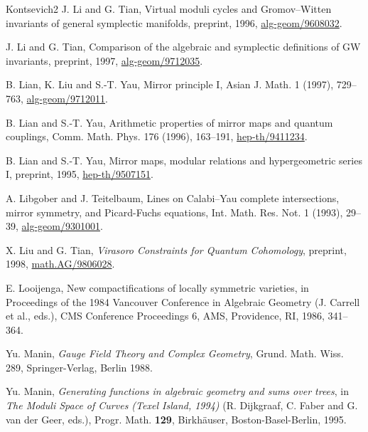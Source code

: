 \begin{thebibliography}{Kontsevich2}
\hypertarget{bib:LTi3}{}
J. Li and G. Tian, Virtual moduli cycles and Gromov--Witten invariants of general symplectic manifolds, preprint, 1996, \href{https://arxiv.org/abs/alg-geom/9608032}{alg-geom/9608032}.

\hypertarget{bib:LTi4}{}
J. Li and G. Tian, Comparison of the algebraic and symplectic definitions of GW invariants, preprint, 1997, \href{https://arxiv.org/abs/alg-geom/9712035}{alg-geom/9712035}.

\hypertarget{bib:LLY}{}
B. Lian, K. Liu and S.-T. Yau, Mirror principle I,
Asian J. Math. 1 (1997), 729--763, \href{https://arxiv.org/abs/alg-geom/9712011}{alg-geom/9712011}.

\hypertarget{bib:LY1}{}
B. Lian and S.-T. Yau,
Arithmetic properties of mirror maps and quantum couplings,
Comm. Math. Phys. 176 (1996), 163--191, \href{https://arxiv.org/abs/hep-th/9411234}{hep-th/9411234}.

\hypertarget{bib:LY2}{}
B. Lian and S.-T. Yau, Mirror maps, modular relations and
hypergeometric series I, preprint, 1995, \href{https://arxiv.org/abs/hep-th/9507151}{hep-th/9507151}.

\hypertarget{bib:LTe}{}
A. Libgober and J. Teitelbaum, Lines on Calabi--Yau complete intersections,
mirror symmetry, and Picard-Fuchs equations, Int. Math. Res. Not. 1 (1993),
29--39, \href{https://arxiv.org/abs/alg-geom/9301001}{alg-geom/9301001}.


\hypertarget{bib:LiuT}{}
X. Liu and G. Tian, \emph{Virasoro Constraints for Quantum Cohomology}, preprint, 1998, \href{https://arxiv.org/abs/math/9806028}{math.AG/9806028}.

\hypertarget{bib:Looijenga}{}
E. Looijenga, New compactifications of locally symmetric varieties, in Proceedings of the 1984 Vancouver Conference in Algebraic Geometry (J. Carrell et al., eds.), CMS Conference Proceedings 6, AMS, Providence, RI, 1986, 341--364.

\hypertarget{bib:Manin1}{} Yu. Manin, \emph{Gauge Field Theory and Complex Geometry}, Grund. Math. Wiss. 289, Springer-Verlag, Berlin 1988.

\hypertarget{bib:Manin2}{} Yu. Manin, \emph{Generating functions in algebraic geometry and sums over trees}, in \emph{The Moduli Space of Curves (Texel Island, 1994)} (R. Dijkgraaf, C. Faber and G. van der Geer, eds.), Progr. Math. \textbf{129}, Birkhäuser, Boston-Basel-Berlin, 1995.


\end{thebibliography}
